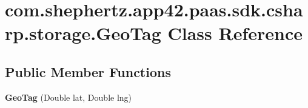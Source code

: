 \hypertarget{classcom_1_1shephertz_1_1app42_1_1paas_1_1sdk_1_1csharp_1_1storage_1_1_geo_tag}{\section{com.\+shephertz.\+app42.\+paas.\+sdk.\+csharp.\+storage.\+Geo\+Tag Class Reference}
\label{classcom_1_1shephertz_1_1app42_1_1paas_1_1sdk_1_1csharp_1_1storage_1_1_geo_tag}
}
\subsection*{Public Member Functions}
\begin{DoxyCompactItemize}
\item 
\hypertarget{classcom_1_1shephertz_1_1app42_1_1paas_1_1sdk_1_1csharp_1_1storage_1_1_geo_tag_ad60db47addac04a1fa9832fb84af1c5d}{{\bfseries Geo\+Tag} (Double lat, Double lng)}\label{classcom_1_1shephertz_1_1app42_1_1paas_1_1sdk_1_1csharp_1_1storage_1_1_geo_tag_ad60db47addac04a1fa9832fb84af1c5d}


\end{DoxyCompactItemize}

